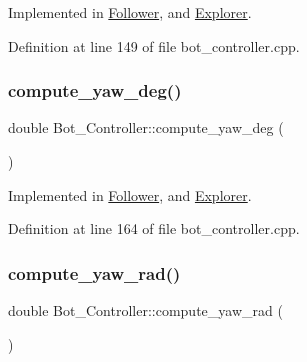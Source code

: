 Implemented in \hyperlink{class_follower_ab87e93b6fafa6f25137ba60d5860558e}{Follower}, and \hyperlink{class_explorer_a5a445fc280b6fb133e1ce02e09920da2}{Explorer}.



Definition at line 149 of file bot\+\_\+controller.\+cpp.

\mbox{\label{class_bot___controller_abda61292c3719a4a5676ddcd0d8311a1}} 
\subsubsection{\texorpdfstring{compute\+\_\+yaw\+\_\+deg()}{compute\_yaw\_deg()}}
{\footnotesize\ttfamily double Bot\+\_\+\+Controller\+::compute\+\_\+yaw\+\_\+deg (\begin{DoxyParamCaption}{ }\end{DoxyParamCaption})\hspace{0.3cm}{\ttfamily [pure virtual]}}



Implemented in \hyperlink{class_follower_a300c727aa90274ffa63a2fb9a6403054}{Follower}, and \hyperlink{class_explorer_a9235375b60669fc046c41318759dc1dc}{Explorer}.



Definition at line 164 of file bot\+\_\+controller.\+cpp.

\mbox{\label{class_bot___controller_a362541183536f955e54234e14f18f3c2}} 
\subsubsection{\texorpdfstring{compute\+\_\+yaw\+\_\+rad()}{compute\_yaw\_rad()}}
{\footnotesize\ttfamily double Bot\+\_\+\+Controller\+::compute\+\_\+yaw\+\_\+rad (\begin{DoxyParamCaption}{ }\end{DoxyParamCaption})\hspace{0.3cm}{\ttfamily [pure virtual]}}



